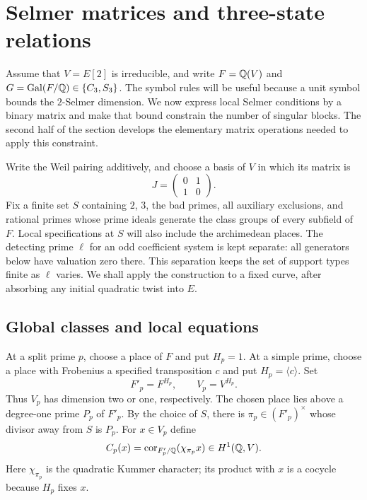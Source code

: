 \section{Selmer matrices and three-state relations}
\label{sec:lm:local-matrices}

Assume that $V=E[2]$ is irreducible, and write
$F=\mathbb Q(V)$ and $G=\operatorname{Gal}(F/\mathbb Q)\in\{C_3,S_3\}$.
The symbol rules will be useful because a unit symbol bounds the
$2$-Selmer dimension. We now express local Selmer conditions by a
binary matrix and make that bound constrain the number of singular
blocks. The second half of the section develops the elementary matrix
operations needed to apply this constraint.

Write the Weil pairing additively, and choose a basis of $V$ in which
its matrix is
\[
 J=\begin{pmatrix}0&1\\1&0\end{pmatrix}.
\]
Fix a finite set $S$ containing $2$, $3$, the bad primes, all auxiliary
exclusions, and rational primes whose prime ideals generate the class
groups of every subfield of $F$. Local specifications at $S$ will also
include the archimedean places. The detecting prime $\ell$ for an odd
coefficient system is kept separate: all generators below have valuation
zero there. This separation keeps the set of support types finite as
$\ell$ varies. We shall apply the construction to a fixed curve, after
absorbing any initial quadratic twist into $E$.

\subsection{Global classes and local equations}

At a split prime $p$, choose a place of $F$ and put $H_p=1$.
At a simple prime, choose a place with Frobenius a specified
transposition $c$ and put $H_p=\langle c\rangle$.
Set
\[
 F'_p=F^{H_p},\qquad V_p=V^{H_p}.
\]
Thus $V_p$ has dimension two or one, respectively. The chosen place
lies above a degree-one prime $P_p$ of $F'_p$. By the choice of $S$,
there is $\pi_p\in(F'_p)^\times$ whose divisor away from $S$ is $P_p$.
For $x\in V_p$ define
\begin{equation}\label{eq:lm:generator-class}
 C_p(x)=\operatorname{cor}_{F'_p/\mathbb Q}(\chi_{\pi_p}x)\in H^1(\mathbb Q,V).
\end{equation}
Here $\chi_{\pi_p}$ is the quadratic Kummer character; its product with
$x$ is a cocycle because $H_p$ fixes $x$.

